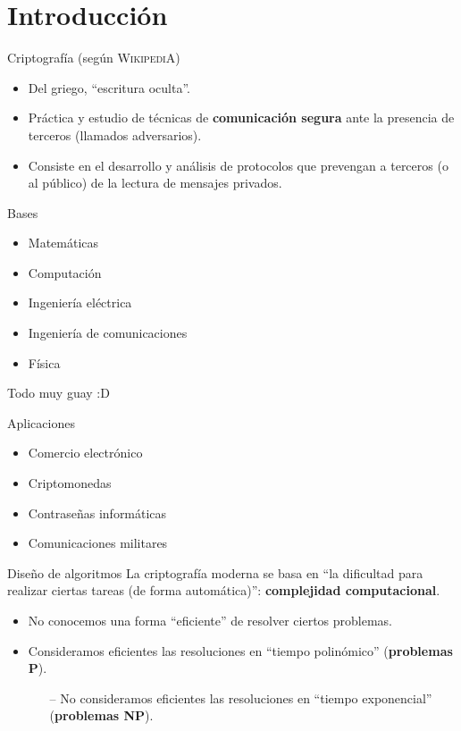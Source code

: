 \documentclass[10pt]{beamer} %
\begin{document}
\section{Introducción}
\begin{frame}{Criptografía (según \textsc{WikipediA})}
\begin{itemize}
    \item Del griego, ``escritura oculta''.
    \item Práctica y estudio de técnicas de \textbf{comunicación segura} ante la presencia de terceros (llamados adversarios).
    \item Consiste en el desarrollo y análisis de protocolos que prevengan a terceros (o al público) de la lectura de mensajes privados.
\end{itemize}
\end{frame}
\begin{frame}{Bases}
\begin{itemize}
    \item Matemáticas
    \item Computación
    \item Ingeniería eléctrica
    \item Ingeniería de comunicaciones
    \item Física
\end{itemize}
Todo muy guay :D
\end{frame}
\begin{frame}{Aplicaciones}
\begin{itemize}
    \item Comercio electrónico
    \item Criptomonedas
    \item Contraseñas informáticas
    \item Comunicaciones militares
\end{itemize}
\end{frame}
\begin{frame}{Diseño de algoritmos}
La criptografía moderna se basa en ``la dificultad para realizar ciertas tareas (de forma automática)'': \textbf{complejidad computacional}.
\begin{itemize}
    \item No conocemos una forma ``eficiente'' de resolver ciertos problemas.
    \item Consideramos eficientes las resoluciones en ``tiempo polinómico'' (\textbf{problemas P}).
    \begin{itemize}
        \item[--] No consideramos eficientes las resoluciones en ``tiempo exponencial'' (\textbf{problemas NP}).
    \end{itemize}
\end{itemize}
\end{frame}
\end{document}
